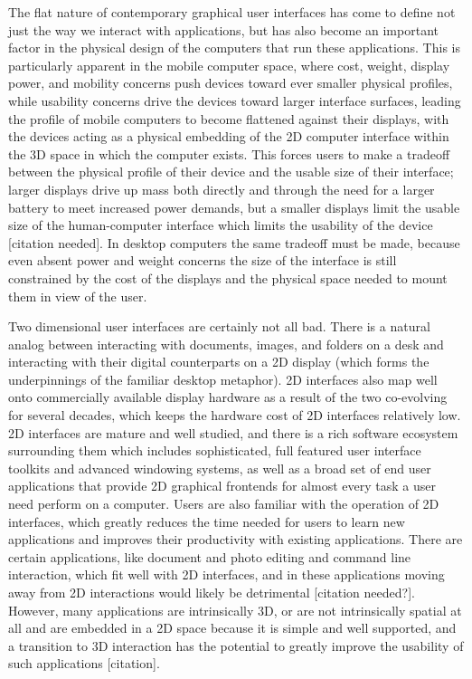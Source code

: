 The flat nature of contemporary graphical user interfaces has come to define not just the way we interact with applications, but has also become an important factor in the physical design of the computers that run these applications. This is particularly apparent in the mobile computer space, where cost, weight, display power, and mobility concerns push devices toward ever smaller physical profiles, while usability concerns drive the devices toward larger interface surfaces, leading the profile of mobile computers to become flattened against their displays, with the devices acting as a physical embedding of the 2D computer interface within the 3D space in which the computer exists. This forces users to make a tradeoff between the physical profile of their device and the usable size of their interface; larger displays drive up mass both directly and through the need for a larger battery to meet increased power demands, but a smaller displays limit the usable size of the human-computer interface which limits the usability of the device [citation needed]. In desktop computers the same tradeoff must be made, because even absent power and weight concerns the size of the interface is still constrained by the cost of the displays and the physical space needed to mount them in view of the user.

Two dimensional user interfaces are certainly not all bad. There is a natural analog between interacting with documents, images, and folders on a desk and interacting with their digital counterparts on a 2D display (which forms the underpinnings of the familiar desktop metaphor). 2D interfaces also map well onto commercially available display hardware as a result of the two co-evolving for several decades, which keeps the hardware cost of 2D interfaces relatively low. 2D interfaces are mature and well studied, and there is a rich software ecosystem surrounding them which includes sophisticated, full featured user interface toolkits and advanced windowing systems, as well as a broad set of end user applications that provide 2D graphical frontends for almost every task a user need perform on a computer. Users are also familiar with the operation of 2D interfaces, which greatly reduces the time needed for users to learn new applications and improves their productivity with existing applications. 
There are certain applications, like document and photo editing and command line interaction, which fit well with 2D interfaces, and in these applications moving away from 2D interactions would likely be detrimental [citation needed?]. However, many applications are intrinsically 3D, or are not intrinsically spatial at all and are embedded in a 2D space because it is simple and well supported, and a transition to 3D interaction has the potential to greatly improve  the usability of such applications [citation].

